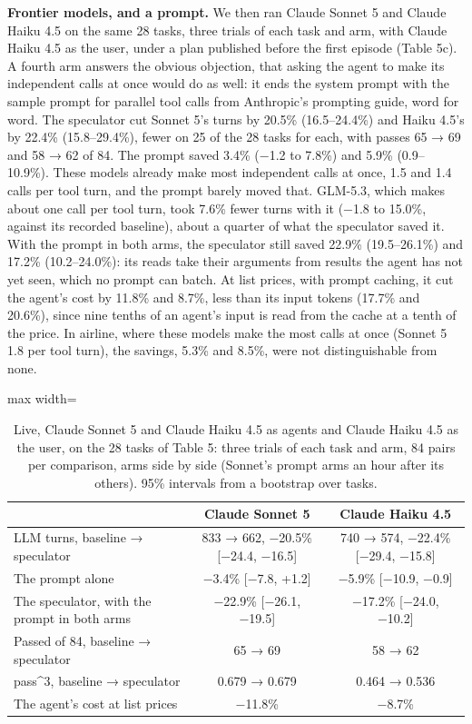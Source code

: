 \documentclass[10pt,twocolumn,letterpaper]{article}
\newcommand{\runin}[1]{{\sffamily\bfseries\color{accent}#1}}
\begin{document}
\runin{Frontier models, and a prompt.} We then ran Claude Sonnet 5 and Claude Haiku 4.5 on the same 28 tasks, three trials of each task and arm, with Claude Haiku 4.5 as the user, under a plan published before the first episode (Table 5c). A fourth arm answers the obvious objection, that asking the agent to make its independent calls at once would do as well: it ends the system prompt with the sample prompt for parallel tool calls from Anthropic's prompting guide, word for word. The speculator cut Sonnet 5's turns by 20.5\% (16.5--24.4\%) and Haiku 4.5's by 22.4\% (15.8--29.4\%), fewer on 25 of the 28 tasks for each, with passes 65 → 69 and 58 → 62 of 84. The prompt saved 3.4\% (−1.2 to 7.8\%) and 5.9\% (0.9--10.9\%). These models already make most independent calls at once, 1.5 and 1.4 calls per tool turn, and the prompt barely moved that. GLM-5.3, which makes about one call per tool turn, took 7.6\% fewer turns with it (−1.8 to 15.0\%, against its recorded baseline), about a quarter of what the speculator saved it. With the prompt in both arms, the speculator still saved 22.9\% (19.5--26.1\%) and 17.2\% (10.2--24.0\%): its reads take their arguments from results the agent has not yet seen, which no prompt can batch. At list prices, with prompt caching, it cut the agent's cost by 11.8\% and 8.7\%, less than its input tokens (17.7\% and 20.6\%), since nine tenths of an agent's input is read from the cache at a tenth of the price. In airline, where these models make the most calls at once (Sonnet 5 1.8 per tool turn), the savings, 5.3\% and 8.5\%, were not distinguishable from none.

\begin{table}[tp]
\centering\small
\renewcommand{\thetable}{5c}
\caption{Live, Claude Sonnet 5 and Claude Haiku 4.5 as agents and Claude Haiku 4.5 as the user, on the 28 tasks of Table 5: three trials of each task and arm, 84 pairs per comparison, arms side by side (Sonnet's prompt arms an hour after its others). 95\% intervals from a bootstrap over tasks.}
\label{tab:5c}
\begin{adjustbox}{max width=\linewidth}
\begin{tabular}{lcc}
\toprule
 & Claude Sonnet 5 & Claude Haiku 4.5 \\
\midrule
LLM turns, baseline → speculator & 833 → 662, −20.5\% {[}−24.4, −16.5{]} & 740 → 574, −22.4\% {[}−29.4, −15.8{]} \\
The prompt alone & −3.4\% {[}−7.8, +1.2{]} & −5.9\% {[}−10.9, −0.9{]} \\
The speculator, with the prompt in both arms & −22.9\% {[}−26.1, −19.5{]} & −17.2\% {[}−24.0, −10.2{]} \\
Passed of 84, baseline → speculator & 65 → 69 & 58 → 62 \\
pass\textasciicircum{}3, baseline → speculator & 0.679 → 0.679 & 0.464 → 0.536 \\
The agent's cost at list prices & −11.8\% & −8.7\% \\
\bottomrule
\end{tabular}
\end{adjustbox}
\end{table}
\end{document}
